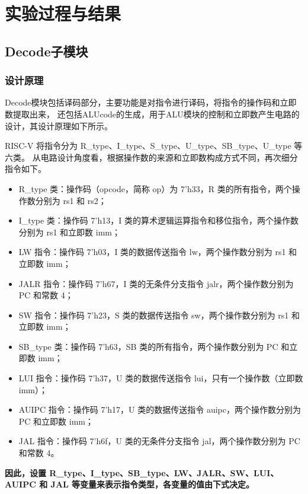 \documentclass[12pt,hyperref,a4paper,UTF8]{ctexart}
\begin{document}
\newpage

\section{实验过程与结果}

\subsection{Decode子模块}


\subsubsection*{\Large 设计原理}
\normalsize

  Decode模块包括译码部分，主要功能是对指令进行译码，将指令的操作码和立即数提取出来，
  还包括ALUcode的生成，用于ALU模块的控制和立即数产生电路的设计，其设计原理如下所示。

  RISC-V 将指令分为 R\_type、I\_type、S\_type、U\_type、SB\_type、U\_type 等六类。
  从电路设计角度看，根据操作数的来源和立即数构成方式不同，再次细分指令如下。

\begin{itemize}
    \item R\_type 类：操作码（opcode，简称 op）为 7'h33，R 类的所有指令，两个操作数分别为 rs1 和 rs2；
    \item I\_type 类：操作码 7'h13，I 类的算术逻辑运算指令和移位指令，两个操作数分别为 rs1 和立即数 imm；
    \item LW 指令：操作码 7'h03，I 类的数据传送指令 lw，两个操作数分别为 rs1 和立即数 imm；
    \item JALR 指令：操作码 7'h67，I 类的无条件分支指令 jalr，两个操作数分别为 PC 和常数 4；
    \item SW 指令：操作码 7'h23，S 类的数据传送指令 sw，两个操作数分别为 rs1 和立即数 imm；
    \item SB\_type 类：操作码 7'h63，SB 类的所有指令，两个操作数分别为 PC 和立即数 imm；
    \item LUI 指令：操作码 7'h37，U 类的数据传送指令 lui，只有一个操作数（立即数 imm）；
    \item AUIPC 指令：操作码 7'h17，U 类的数据传送指令 auipc，两个操作数分别为 PC 和立即数 imm；
    \item JAL 指令：操作码 7'h6f，U 类的无条件分支指令 jal，两个操作数分别为 PC 和常数 4。
\end{itemize}

\textbf{因此，设置 R\_type、I\_type、SB\_type、LW、JALR、SW、LUI、AUIPC 和 JAL 等变量来表示指令类型，各变量的值由下式决定。}
\end{document}
